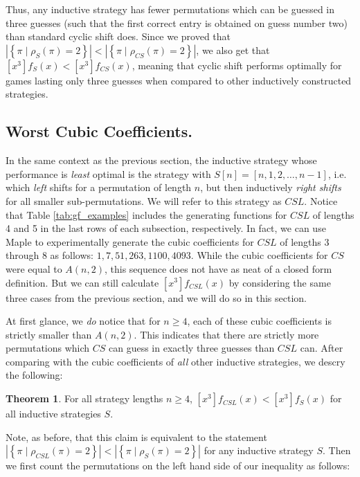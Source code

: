 \documentclass[article]{amsart}
\theoremstyle{definition}
\newtheorem{theorem}{Theorem}[section]
\theoremstyle{definition}
\theoremstyle{remark}
\begin{document}
Thus, any inductive strategy has fewer permutations which can be guessed in three guesses (such that the first correct entry is obtained on guess number two) than standard cyclic shift does. Since we proved that $\left| \left\{ \pi \mid \rho_{S}(\pi) = 2 \right\} \right| < \left| \left\{ \pi \mid \rho_{CS}(\pi) = 2 \right\} \right|$, we also get that $[x^3]f_S(x) < [x^3]f_{CS}(x)$, meaning that cyclic shift performs optimally for games lasting only three guesses when compared to other inductively constructed strategies. 


\subsection{Worst Cubic Coefficients.} \label{sub:worstcubic}

In the same context as the previous section, the inductive strategy whose performance is \textit{least} optimal is the strategy with $S[n] = [n,1,2,\dots,n-1]$, i.e. which \textit{left} shifts for a permutation of length $n$, but then inductively \textit{right shifts} for all smaller sub-permutations. We will refer to this strategy as $CSL$. Notice that Table \ref{tab:gf_examples} includes the generating functions for $CSL$ of lengths 4 and 5 in the last rows of each subsection, respectively. In fact, we can use Maple to experimentally generate the cubic coefficients for $CSL$ of lengths 3 through 8 as follows: $1,7,51,263,1100,4093$. While the cubic coefficients for $CS$ were equal to $A(n,2)$, this sequence does not have as neat of a closed form definition. But we can still calculate $[x^3]f_{CSL}(x)$ by considering the same three cases from the previous section, and we will do so in this section.

At first glance, we \textit{do} notice that for $n \geq 4$, each of these cubic coefficients is strictly smaller than $A(n,2)$. This indicates that there are strictly more permutations which $CS$ can guess in exactly three guesses than $CSL$ can. After comparing with the cubic coefficients of \textit{all} other inductive strategies, we descry the following:

\begin{theorem} \label{thm:worstcubic}
    For all strategy lengths $n \geq 4$, $[x^3]f_{CSL}(x) < [x^3]f_{S}(x)$ for all inductive strategies $S$.
\end{theorem}

Note, as before, that this claim is equivalent to the statement $\left| \left\{ \pi \mid \rho_{CSL}(\pi) = 2 \right\} \right| < \left| \left\{ \pi \mid \rho_{S}(\pi) = 2 \right\} \right|$ for any inductive strategy $S$. Then we first count the permutations on the left hand side of our inequality as follows:
\end{document}
